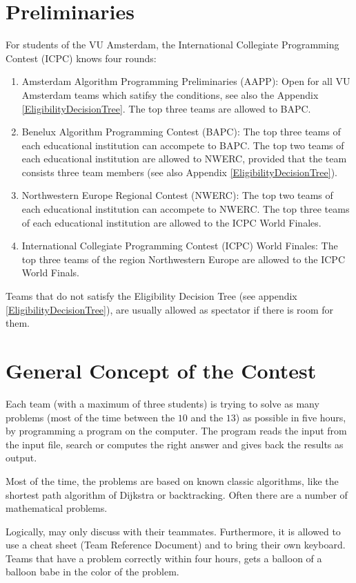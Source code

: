 \section{Preliminaries}
For students of the VU Amsterdam, the International Collegiate Programming Contest (ICPC) knows four rounds:
\begin{enumerate}
\item Amsterdam Algorithm Programming Preliminaries (AAPP): Open for all VU Amsterdam teams which satifsy the conditions, see also the Appendix \ref{EligibilityDecisionTree}. The top three teams are allowed to BAPC.
\item Benelux Algorithm Programming Contest (BAPC): The top three teams of each educational institution can accompete to BAPC. The top two teams of  each educational institution are allowed to NWERC, provided that the team consists three team members (see also Appendix \ref{EligibilityDecisionTree}).
\item Northwestern Europe Regional Contest (NWERC): The top two teams of each educational institution can accompete to NWERC. The top three teams of  each educational institution are allowed to the ICPC World Finales.
\item International Collegiate Programming Contest (ICPC) World Finales: The top three teams of the region Northwestern Europe are allowed to the ICPC World Finals.
\end{enumerate}
Teams that do not satisfy the Eligibility Decision Tree (see appendix \ref{EligibilityDecisionTree}), are usually allowed as spectator if there is room for them.

\section{General Concept of the Contest}
Each team (with a maximum of three students) is trying to solve as many problems (most of the time between the $10$ and the $13$) as possible in five hours, by programming a program on the computer. The program reads the input from the input file, search or computes the right answer and gives back the results as output.

Most of the time, the problems are based on known classic algorithms, like the shortest path algorithm of Dijkstra or backtracking. Often there are a number of mathematical problems.

Logically, may only discuss with their teammates. Furthermore, it is allowed to use a cheat sheet (Team Reference Document) and to bring their own keyboard. Teams that have a problem correctly within four hours, gets a balloon of a balloon babe in the color of the problem.


